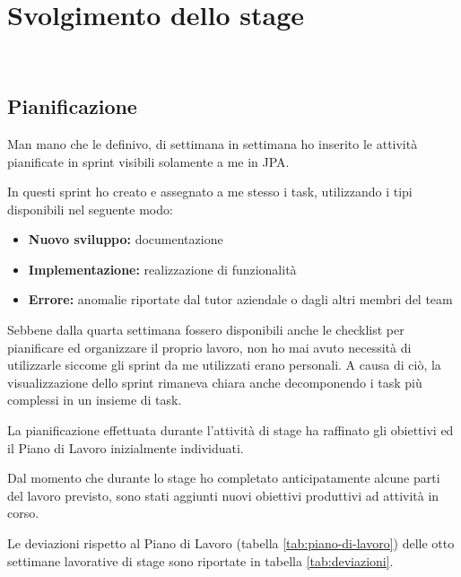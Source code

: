 
\chapter{Svolgimento dello stage}
\label{cap:progetto}

\\

\section{Pianificazione}\label{sec:prog-pianif}

Man mano che le definivo, di settimana in settimana ho inserito le attività
pianificate in sprint visibili solamente a me in JPA.

In questi sprint ho creato e assegnato a me stesso i task, utilizzando i tipi
disponibili nel seguente modo:

\begin{itemize}
\item \textbf{Nuovo sviluppo:} documentazione
\item \textbf{Implementazione:} realizzazione di funzionalità
\item \textbf{Errore:} anomalie riportate dal tutor aziendale o dagli altri
  membri del team
\end{itemize}

Sebbene dalla quarta settimana fossero disponibili anche le checklist per
pianificare ed organizzare il proprio lavoro, non ho mai avuto necessità di
utilizzarle siccome gli sprint da me utilizzati erano personali. A causa
di ciò, la visualizzazione dello sprint rimaneva chiara anche decomponendo i
task più complessi in un insieme di task.

La pianificazione effettuata durante l'attività di stage ha raffinato gli
obiettivi ed il Piano di Lavoro inizialmente individuati.

Dal momento che durante lo stage ho completato anticipatamente alcune parti
del lavoro previsto, sono stati aggiunti nuovi obiettivi produttivi ad
attività in corso.

Le deviazioni rispetto al Piano di Lavoro (tabella \ref{tab:piano-di-lavoro})
delle otto settimane lavorative di stage sono riportate in tabella
\ref{tab:deviazioni}.

